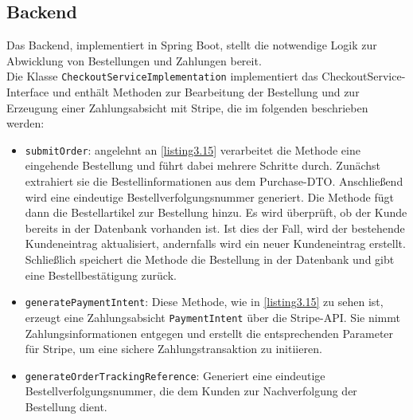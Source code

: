 \subsection{Backend}

Das Backend, implementiert in Spring Boot, stellt die notwendige Logik zur Abwicklung von Bestellungen und Zahlungen bereit.\\
Die Klasse \verb*|CheckoutServiceImplementation| implementiert das CheckoutService-Interface und enthält Methoden zur Bearbeitung der Bestellung und zur Erzeugung einer Zahlungsabsicht mit Stripe, die im folgenden beschrieben werden: 

\begin{itemize}
	\item \verb*|submitOrder|: angelehnt an \ref{listing3.15} verarbeitet die Methode eine eingehende Bestellung und führt dabei mehrere Schritte durch. Zunächst extrahiert sie die Bestellinformationen aus dem Purchase-DTO. Anschließend wird eine eindeutige Bestellverfolgungsnummer generiert. Die Methode fügt dann die Bestellartikel zur Bestellung hinzu. Es wird überprüft, ob der Kunde bereits in der Datenbank vorhanden ist. Ist dies der Fall, wird der bestehende Kundeneintrag aktualisiert, andernfalls wird ein neuer Kundeneintrag erstellt. Schließlich speichert die Methode die Bestellung in der Datenbank und gibt eine Bestellbestätigung zurück.
	\item \verb*|generatePaymentIntent|: Diese Methode, wie in \ref{listing3.15} zu sehen ist, erzeugt eine Zahlungsabsicht \verb*|PaymentIntent| über die Stripe-API. Sie nimmt Zahlungsinformationen entgegen und erstellt die entsprechenden Parameter für Stripe, um eine sichere Zahlungstransaktion zu initiieren.
	\item \verb*|generateOrderTrackingReference|: Generiert eine eindeutige Bestellverfolgungsnummer, die dem Kunden zur Nachverfolgung der Bestellung dient.
\end{itemize}

\newpage

